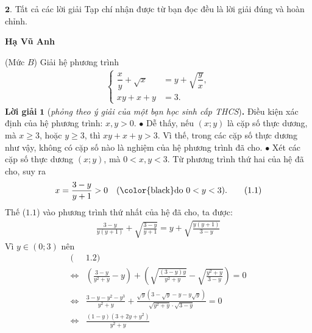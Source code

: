 \begin{multicols}{2}
	\vskip 0.05cm
	$\pmb{2.}$ Tất cả các lời giải Tạp chí nhận được từ bạn đọc đều là lời giải đúng và hoàn chỉnh.
	\begin{flushright}
		\textbf{\color{thachthuctoanhoc}Hạ Vũ Anh}
	\end{flushright}
	{}
	(Mức $B$) Giải hệ phương trình 
	\begin{align*}
		\begin{cases}
			\dfrac{x}{y}+\sqrt{x}&=y+\sqrt{\dfrac{y}{x}},
			\\x y+x+y&=3.
		\end{cases}
	\end{align*}
	\textbf{\color{thachthuctoanhoc}Lời giải} $\pmb{1}$ (\textit{phỏng theo ý giải của một bạn học sinh cấp THCS})\textbf{\color{thachthuctoanhoc}.}
	\vskip 0.05cm
	Điều kiện xác định của hệ phương trình: $x, y > 0$.
	\vskip 0.05cm
	$\bullet$ Dễ thấy, nếu $(x; y)$ là cặp số thực dương, mà $x \ge 3$, hoặc $y \ge 3$, thì $xy + x + y > 3$. Vì thế, trong các cặp số thực dương như vậy, không có cặp số nào là nghiệm của hệ phương trình đã cho.
	\vskip 0.05cm
	$\bullet$ Xét các cặp số thực dương $(x; y)$, mà $0 < x, y < 3$.
	\vskip 0.05cm
	Từ phương trình thứ hai của hệ đã cho, suy ra
	\begin{align*}
		x = \frac{{3 - y}}{{y + 1}} > 0  \quad(\text{\color{black}do } 0 < y < 3).      \tag{$1.1$}
	\end{align*}
	Thế ($1.1$) vào phương trình thứ nhất của hệ đã cho, ta được:
	\begin{align*}
		\frac{{3 \!-\! y}}{{y\left( {y \!+\! 1} \right)}} \!+\! \sqrt {\frac{{3 \!-\! y}}{{y \!+\! 1}}}  \!=\! y \!+\! \sqrt {\frac{{y\left( {y \!+\! 1} \right)}}{{3 \!-\! y}}} \tag{$1.2$}
	\end{align*}
	Vì $y \in (0; 3)$ nên
	\begin{align*}
		(&1.2) \\
		\Leftrightarrow &\left(\!{\frac{{3 \!-\! y}}{{{y^2} \!+\! y}} \!-\! y}\! \right) \!+\!\! \left(\!\!\!\! {\sqrt {\frac{{\left( {3 \!-\! y} \right)y}}{{{y^2} \!+\! y}}}  \!-\! \sqrt {\frac{{{y^2} \!+\! y}}{{3 \!-\! y}}} } \right) \!\!=\! 0\\
		\Leftrightarrow &\frac{{3 \!-\! y \!-\! {y^2} \!-\! {y^3}}}{{{y^2} \!+\! y}} \!+\! \frac{{\sqrt y \left( {3 \!-\! \sqrt y  \!-\! y \!-\! y\sqrt y } \right)}}{{\sqrt {{y^2} \!+\! y}  \!\cdot\! \sqrt {3 \!-\! y} }} \!=\! 0\\
		\Leftrightarrow&\frac{{\left( {1 - y} \right)\left( {3 + 2y + {y^2}} \right)}}{{{y^2} + y}} \\

\end{align*}
\end{multicols}
